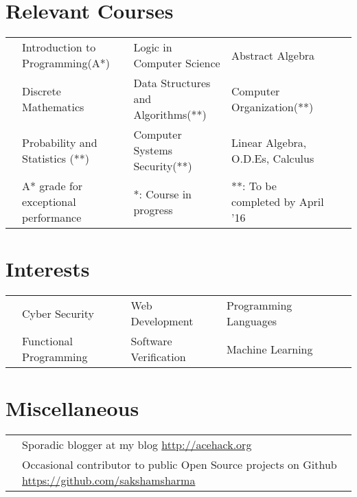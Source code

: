 \documentclass[11pt,a4paper]{moderncv}
\newcommand{\onepage}[1]{
\ifdefined\onep
#1
\fi
}
\newcommand{\twopage}[1]{
\ifdefined\twop
#1
\fi
}
\newcommand{\secspace}{
\onepage{\vspace{-0.27cm}}
\twopage{\vspace{-0.1cm}}
}
\newcommand{\secbelow}{
\onepage{\vspace{-0.07cm}}
}
\begin{document}
\secspace
\section*{Relevant Courses}
\secbelow
\begin{tabular}{L{0.05cm} L{6.2cm} L{6.5cm} L{7.5cm} L{8cm} L{13cm}}
  & Introduction to Programming(A*)  & Logic in Computer Science & Abstract Algebra\\
& Discrete Mathematics             & Data Structures and Algorithms(**) & Computer Organization(**)\\
& Probability and Statistics (**)  & Computer Systems Security(**) & Linear Algebra, O.D.Es, Calculus\\
  \vspace{0.2cm}
& \footnotesize{A* grade for exceptional performance}
& \footnotesize{*: Course in progress}
& \footnotesize{**: To be completed by April '16}
\end{tabular}

\secspace
\section*{Interests}
\secbelow
\begin{tabular}{L{0.05cm} L{5.8cm} L{6.5cm} L{7.5cm} L{8cm} L{13cm}}
  & Cyber Security         & Web Development       & Programming Languages\\
  & Functional Programming & Software Verification & Machine Learning
\end{tabular}

\secspace
\section*{Miscellaneous}
\secbelow
\begin{tabular}{L{0.05cm} l}
  & Sporadic blogger at my blog \url{http://acehack.org}\\
  & Occasional contributor to public Open Source projects on Github \url{https://github.com/sakshamsharma}
\end{tabular}
\end{document}
